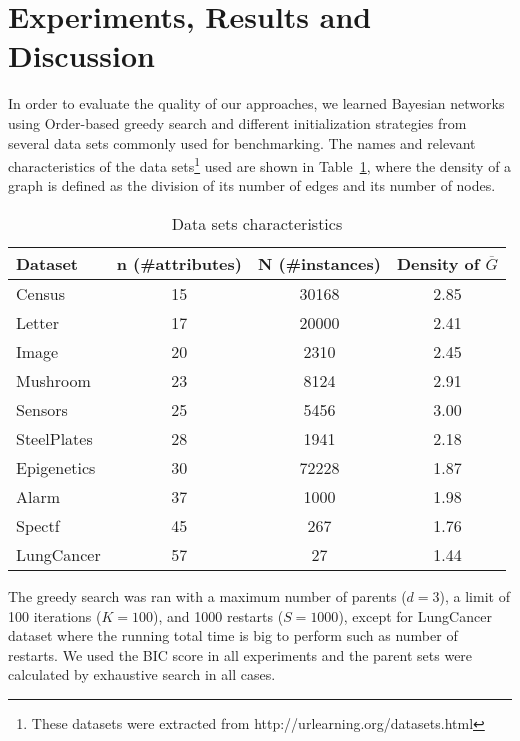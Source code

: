 \section{Experiments, Results and Discussion}
\label{sec:experiments}

In order to evaluate the quality of our approaches, we learned Bayesian networks using Order-based greedy search and different initialization strategies from several data sets commonly used for benchmarking. The names and relevant characteristics of the data sets\footnote{These datasets were extracted from http://urlearning.org/datasets.html} used are shown in Table~\ref{tab:datasets}, where the density of a graph is defined as the division of its number of edges and its number of nodes.
	\begin{table}[ h ]
		\centering
		\begin{tabular}{ | l | c | c | c | }
			\hline
			Dataset & n (\#attributes) & N (\#instances) & Density of $\overline G$ \\ \hline
			Census & 15 & 30168 & 2.85 \\ \hline
			Letter & 17 & 20000 & 2.41 \\ \hline
			Image & 20 & 2310 & 2.45 \\ \hline
			Mushroom & 23 & 8124 & 2.91 \\ \hline
			Sensors & 25 & 5456 & 3.00 \\ \hline
			SteelPlates & 28 & 1941 & 2.18 \\ \hline
			Epigenetics & 30 & 72228 & 1.87 \\ \hline
			Alarm & 37 & 1000 & 1.98 \\ \hline
			Spectf & 45 & 267 & 1.76 \\ \hline
			LungCancer & 57 & 27 & 1.44 \\ \hline
		\end{tabular}
		\caption{Data sets characteristics}
		\label{tab:datasets}
	\end{table}
The greedy search was ran with a maximum number of parents ($d=3$), a limit of 100 iterations ($K=100$), and 1000 restarts ($S=1000$), except for LungCancer dataset where the running total time is big to perform such as number of restarts. We used the BIC score in all experiments and the parent sets were calculated by exhaustive search in all cases.

